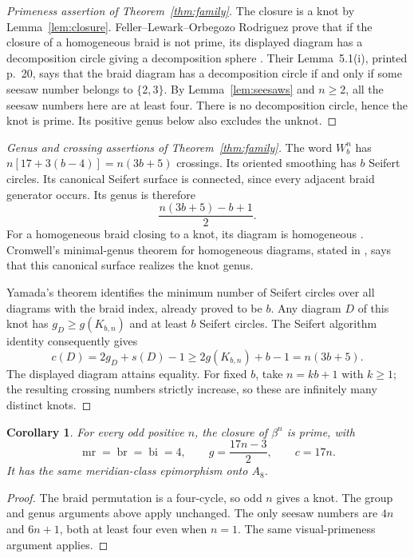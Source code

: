 \documentclass[11pt]{article}
\newtheorem{corollary}[theorem]{Corollary}
\newcommand{\mr}{\operatorname{mr}}
\newcommand{\br}{\operatorname{br}}
\newcommand{\bi}{\operatorname{bi}}
\begin{document}
\begin{proof}[Primeness assertion of Theorem~\ref{thm:family}]
The closure is a knot by Lemma~\ref{lem:closure}. Feller--Lewark--Orbegozo
Rodriguez prove that if the closure of a homogeneous braid is not prime,
its displayed diagram has a decomposition circle giving a decomposition
sphere \cite[Theorem~1.1, printed p.~1]{flo}.
Their Lemma~5.1(i), printed p.~20, says that the braid diagram has a
decomposition circle if and only if some seesaw number belongs to
$\{2,3\}$. By Lemma~\ref{lem:seesaws} and $n\ge2$, all the seesaw
numbers here are at least four. There is no decomposition circle, hence
the knot is prime. Its positive genus below also excludes the unknot.
\end{proof}

\begin{proof}[Genus and crossing assertions of Theorem~\ref{thm:family}]
The word $W_b^n$ has $n[17+3(b-4)]=n(3b+5)$ crossings. Its oriented
smoothing has $b$ Seifert circles. Its canonical Seifert surface is
connected, since every adjacent braid generator occurs. Its genus is
therefore
\[
                  \frac{n(3b+5)-b+1}{2}.
\]
For a homogeneous braid closing to a knot, its diagram is homogeneous
\cite[Lemma~2.2, printed p.~5]{abe}. Cromwell's minimal-genus theorem
for homogeneous diagrams, stated in \cite[Theorem~2.3, same page]{abe},
says that this canonical surface realizes the knot genus.

Yamada's theorem \cite[Theorem~3, printed p.~347]{yamada} identifies the
minimum number of Seifert circles over all diagrams with the braid
index, already proved to be $b$. Any diagram $D$ of this knot has
$g_D\ge g(K_{b,n})$ and at least $b$ Seifert circles. The Seifert
algorithm identity consequently gives
\[
 c(D)=2g_D+s(D)-1\ge2g(K_{b,n})+b-1=n(3b+5).
\]
The displayed diagram attains equality. For fixed $b$, take
$n=kb+1$ with $k\ge1$; the resulting crossing numbers strictly increase,
so these are infinitely many distinct knots.
\end{proof}

\begin{corollary}\label{cor:four}
For every odd positive $n$, the closure of $\beta^n$ is prime, with
\[
 \mr=\br=\bi=4,\qquad g=\frac{17n-3}{2},\qquad c=17n.
\]
It has the same meridian-class epimorphism onto $A_8$.
\end{corollary}
\begin{proof}
The braid permutation is a four-cycle, so odd $n$ gives a knot. The
group and genus arguments above apply unchanged. The only seesaw
numbers are $4n$ and $6n+1$, both at least four even when $n=1$.
The same visual-primeness argument applies.
\end{proof}
\end{document}
